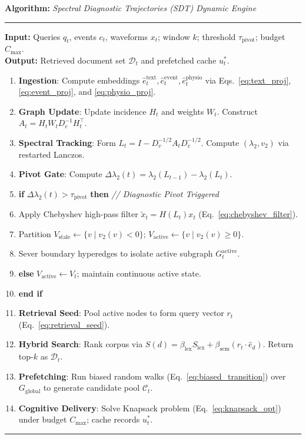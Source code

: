 \documentclass[10pt, onecolumn]{article}
\newenvironment{pseudocode}[1]{%
  \begin{list}{}{\setlength{\leftmargin}{1em}\setlength{\itemsep}{1pt}}
  \item \textbf{Algorithm:} \textit{#1}
  \item \hrule \medskip
}{%
  \vspace{4pt}\hrule
  \end{list}
}
\begin{document}
\begin{pseudocode}{Spectral Diagnostic Trajectories (SDT) Dynamic Engine}
\textbf{Input:} Queries $q_t$, events $c_t$, waveforms $x_t$; window $k$; threshold $\tau_{\text{pivot}}$; budget $C_{\max}$.\\
\textbf{Output:} Retrieved document set $\mathcal{D}_t$ and prefetched cache $u_t^*$.
\begin{enumerate}
  \item \textbf{Ingestion}: Compute embeddings $\hat{e}_t^{\text{text}}, \hat{e}_t^{\text{event}}, \hat{e}_t^{\text{physio}}$ via Eqs.~\eqref{eq:text_proj}, \eqref{eq:event_proj}, and \eqref{eq:physio_proj}.
  \item \textbf{Graph Update}: Update incidence $H_t$ and weights $W_t$. Construct $A_t = H_t W_t D_e^{-1} H_t^\top$.
  \item \textbf{Spectral Tracking}: Form $L_t = I - D_v^{-1/2} A_t D_v^{-1/2}$. Compute $(\lambda_2, v_2)$ via restarted Lanczos.
  \item \textbf{Pivot Gate}: Compute $\Delta \lambda_2(t) = \lambda_2(L_{t-1}) - \lambda_2(L_t)$.
  \item \textbf{if} $\Delta \lambda_2(t) > \tau_{\text{pivot}}$ \textbf{then} \quad \textit{// Diagnostic Pivot Triggered}
  \item \quad Apply Chebyshev high-pass filter $\tilde{x}_t = H(L_t) x_t$ (Eq.~\eqref{eq:chebyshev_filter}).
  \item \quad Partition $V_{\text{stale}} \leftarrow \{v \mid v_2(v) < 0\}$; $V_{\text{active}} \leftarrow \{v \mid v_2(v) \ge 0\}$.
  \item \quad Sever boundary hyperedges to isolate active subgraph $G_t^{\text{active}}$.
  \item \textbf{else} $V_{\text{active}} \leftarrow V_t$; maintain continuous active state.
  \item \textbf{end if}
  \item \textbf{Retrieval Seed}: Pool active nodes to form query vector $r_t$ (Eq.~\eqref{eq:retrieval_seed}).
  \item \textbf{Hybrid Search}: Rank corpus via $S(d) = \beta_{\text{lex}} S_{\text{lex}} + \beta_{\text{sem}} (r_t \cdot \hat{e}_d)$. Return top-$k$ as $\mathcal{D}_t$.
  \item \textbf{Prefetching}: Run biased random walks (Eq.~\eqref{eq:biased_transition}) over $G_{\text{global}}$ to generate candidate pool $\mathcal{C}_t$.
  \item \textbf{Cognitive Delivery}: Solve Knapsack problem (Eq.~\eqref{eq:knapsack_opt}) under budget $C_{\max}$; cache records $u_t^*$.
\end{enumerate}
\end{pseudocode}
\end{document}
